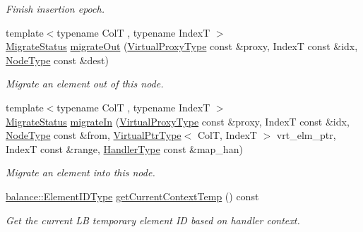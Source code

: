 \begin{DoxyCompactItemize}
\begin{DoxyCompactList}\small\item\em Finish insertion epoch. \end{DoxyCompactList}\item 
{\footnotesize template$<$typename ColT , typename IndexT $>$ }\\\hyperlink{namespacevt_1_1vrt_1_1collection_ad221ad8aea9e586689b4335f5bcd9804}{Migrate\+Status} \hyperlink{structvt_1_1vrt_1_1collection_1_1_collection_manager_a480360a498a18520cbe2405ebbe7e9b6}{migrate\+Out} (\hyperlink{namespacevt_a1b417dd5d684f045bb58a0ede70045ac}{Virtual\+Proxy\+Type} const \&proxy, IndexT const \&idx, \hyperlink{namespacevt_a866da9d0efc19c0a1ce79e9e492f47e2}{Node\+Type} const \&dest)
\begin{DoxyCompactList}\small\item\em Migrate an element out of this node. \end{DoxyCompactList}\item 
{\footnotesize template$<$typename ColT , typename IndexT $>$ }\\\hyperlink{namespacevt_1_1vrt_1_1collection_ad221ad8aea9e586689b4335f5bcd9804}{Migrate\+Status} \hyperlink{structvt_1_1vrt_1_1collection_1_1_collection_manager_afb1aad3179facb178c032b6ae14d592a}{migrate\+In} (\hyperlink{namespacevt_a1b417dd5d684f045bb58a0ede70045ac}{Virtual\+Proxy\+Type} const \&proxy, IndexT const \&idx, \hyperlink{namespacevt_a866da9d0efc19c0a1ce79e9e492f47e2}{Node\+Type} const \&from, \hyperlink{structvt_1_1vrt_1_1collection_1_1_collection_manager_a1da9015e52d6ecca955f57b59aab0b82}{Virtual\+Ptr\+Type}$<$ ColT, IndexT $>$ vrt\+\_\+elm\+\_\+ptr, IndexT const \&range, \hyperlink{namespacevt_af64846b57dfcaf104da3ef6967917573}{Handler\+Type} const \&map\+\_\+han)
\begin{DoxyCompactList}\small\item\em Migrate an element into this node. \end{DoxyCompactList}\item 
\hyperlink{namespacevt_1_1vrt_1_1collection_1_1balance_a14c8d2c972f2913aa3f1636e5be0a120}{balance\+::\+Element\+I\+D\+Type} \hyperlink{structvt_1_1vrt_1_1collection_1_1_collection_manager_a3b98d63294b7f4faf8a64bcb91df69d4}{get\+Current\+Context\+Temp} () const
\begin{DoxyCompactList}\small\item\em Get the current LB temporary element ID based on handler context. \end{DoxyCompactList}\item 

\end{DoxyCompactItemize}
